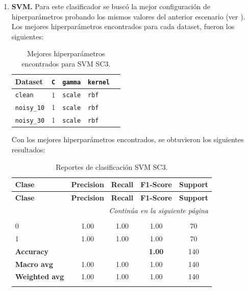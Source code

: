 \documentclass[12pt,a4paper]{article}
\begin{document}
\begin{enumerate}
  \item \textbf{SVM.}
  Para este clasificador se buscó la mejor configuración de hiperparámetros probando los mismos valores del 
  anterior escenario (ver ). Los mejores hiperparámetros encontrados para cada dataset, 
  fueron los siguientes:

  \begin{table}[htbp]
    \centering\small
    \setlength{\tabcolsep}{4pt}
    \begin{tabularx}{\linewidth}{@{}l c c l c@{}}
      \toprule
      \textbf{Dataset} & \texttt{C} & \texttt{gamma} & \texttt{kernel} \\
      \midrule
      \texttt{clean}     & 1 & \texttt{scale} & \texttt{rbf}\\
      \texttt{noisy\_10} & 1 & \texttt{scale} & \texttt{rbf}\\
      \texttt{noisy\_30} & 1 & \texttt{scale} & \texttt{rbf}\\
      \bottomrule
    \end{tabularx}
    \caption{Mejores hiperparámetros encontrados para SVM SC3.}
    \label{tab:best_hparams_svm_sc3}
  \end{table}
  
  Con los mejores hiperparámetros encontrados, se obtuvieron los siguientes resultados:

  \small
  \setlength{\tabcolsep}{4pt}
  \begin{longtable}{@{}lcccc@{}}
    \toprule
    \textbf{Clase} & \textbf{Precision} & \textbf{Recall} & \textbf{F1-Score} & \textbf{Support} \\
    \midrule
    \endfirsthead

    \toprule
    \textbf{Clase} & \textbf{Precision} & \textbf{Recall} & \textbf{F1-Score} & \textbf{Support} \\
    \midrule
    \endhead

    \midrule
    \multicolumn{5}{r}{\emph{Continúa en la siguiente página}} \\
    \endfoot

    \bottomrule
    \caption{Reportes de clasificación SVM SC3.}
    \label{tab:reportes_clasificacion_svm_sc3}
    \endlastfoot

    \multicolumn{5}{@{}l}{\textbf{(a) clean}}\\
    0 & 1.00 & 1.00 & 1.00 & 70 \\
    1 & 1.00 & 1.00 & 1.00 & 70 \\
    \midrule
    \multicolumn{3}{l}{\textbf{Accuracy}}     & \textbf{1.00} & 140 \\
    \textbf{Macro avg}    & 1.00 & 1.00 & 1.00 & 140 \\
    \textbf{Weighted avg} & 1.00 & 1.00 & 1.00 & 140 \\
    \addlinespace[0.8em]


\end{longtable}
\end{enumerate}
\end{document}
